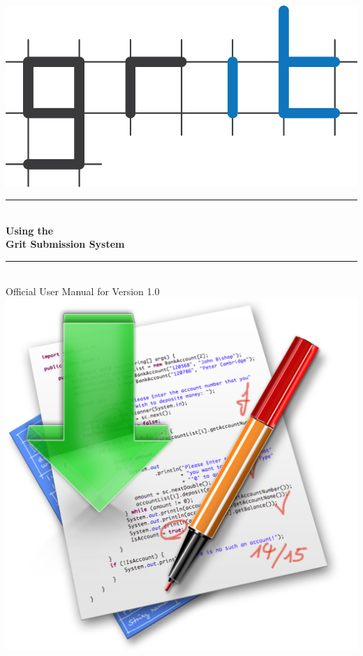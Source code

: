 \documentclass[10pt,a4paper, titlepage, toc=idx]{scrreprt}
\newcommand{\HRule}{\rule{\linewidth}{0.5mm}}
\theoremstyle{definition}
\theoremstyle{plain}
\newcommand*{\product}{Grit}
\newcommand*{\version}{1.0}
\begin{document}
% 
\begin{titlepage}
  \begin{center}
			
			
    \includegraphics{grit}
			
    \HRule \\[0.4cm]
    { \huge \bfseries Using the\\\product{} Submission
      System \\[0.4cm] }
			
    \HRule \\[.5cm]
			
			
    {\small Official User Manual for Version \version}\\[1.5cm]
			
    \includegraphics[scale=.25]{1024}
			

\end{center}
\end{titlepage}
\end{document}
